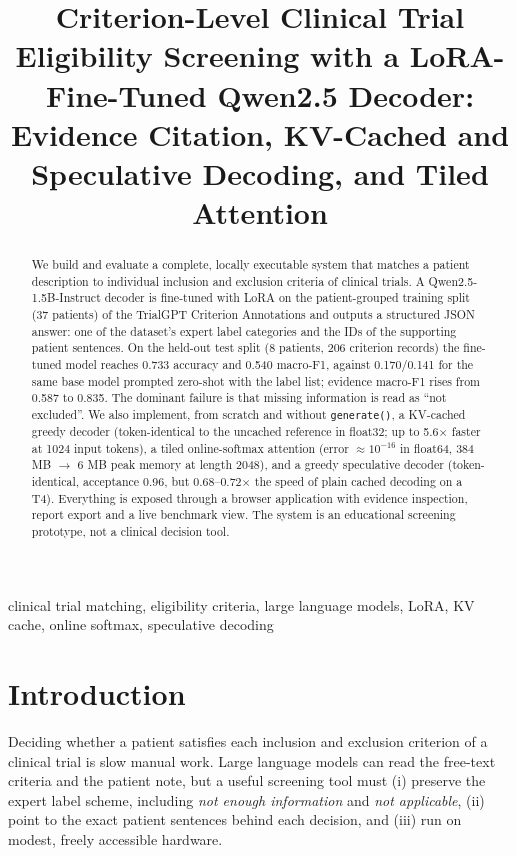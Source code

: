 \documentclass[conference]{IEEEtran}
\begin{document}
\title{Criterion-Level Clinical Trial Eligibility Screening with a LoRA-Fine-Tuned Qwen2.5 Decoder: Evidence Citation, KV-Cached and Speculative Decoding, and Tiled Attention}

\author{
}

\maketitle

\begin{abstract}
We build and evaluate a complete, locally executable system that matches a patient description to individual inclusion and exclusion criteria of clinical trials. A Qwen2.5-1.5B-Instruct decoder is fine-tuned with LoRA on the patient-grouped training split (37 patients) of the TrialGPT Criterion Annotations and outputs a structured JSON answer: one of the dataset's expert label categories and the IDs of the supporting patient sentences. On the held-out test split (8 patients, 206 criterion records) the fine-tuned model reaches 0.733 accuracy and 0.540 macro-F1, against 0.170/0.141 for the same base model prompted zero-shot with the label list; evidence macro-F1 rises from 0.587 to 0.835. The dominant failure is that missing information is read as ``not excluded''. We also implement, from scratch and without \texttt{generate()}, a KV-cached greedy decoder (token-identical to the uncached reference in float32; up to 5.6$\times$ faster at 1024 input tokens), a tiled online-softmax attention (error $\approx10^{-16}$ in float64, 384 MB $\rightarrow$ 6 MB peak memory at length 2048), and a greedy speculative decoder (token-identical, acceptance 0.96, but 0.68--0.72$\times$ the speed of plain cached decoding on a T4). Everything is exposed through a browser application with evidence inspection, report export and a live benchmark view. The system is an educational screening prototype, not a clinical decision tool.
\end{abstract}

\begin{IEEEkeywords}
clinical trial matching, eligibility criteria, large language models, LoRA, KV cache, online softmax, speculative decoding
\end{IEEEkeywords}

\section{Introduction}
Deciding whether a patient satisfies each inclusion and exclusion criterion of a clinical trial is slow manual work. Large language models can read the free-text criteria and the patient note, but a useful screening tool must (i) preserve the expert label scheme, including \emph{not enough information} and \emph{not applicable}, (ii) point to the exact patient sentences behind each decision, and (iii) run on modest, freely accessible hardware.
\end{document}
